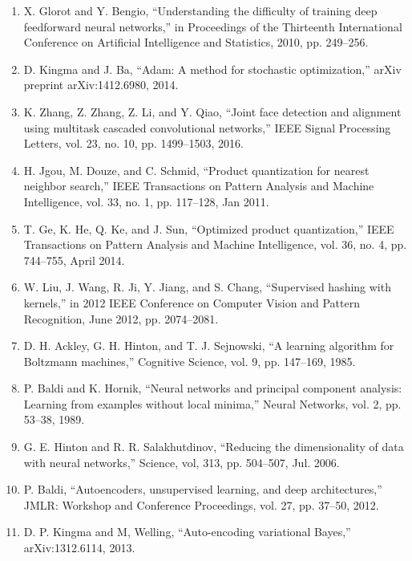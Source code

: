 \documentclass{article}
\begin{document}
\begin{enumerate}
	\item X. Glorot and Y. Bengio, “Understanding the difficulty of training
	deep feedforward neural networks,” in Proceedings of the Thirteenth
	International Conference on Artificial Intelligence and Statistics, 2010,
	pp. 249–256.

	\item D. Kingma and J. Ba, “Adam: A method for stochastic optimization,”
	arXiv preprint arXiv:1412.6980, 2014.

	\item K. Zhang, Z. Zhang, Z. Li, and Y. Qiao, “Joint face detection and
	alignment using multitask cascaded convolutional networks,” IEEE
	Signal Processing Letters, vol. 23, no. 10, pp. 1499–1503, 2016.

	\item H. Jgou, M. Douze, and C. Schmid, “Product quantization for nearest
	neighbor search,” IEEE Transactions on Pattern Analysis and Machine
	Intelligence, vol. 33, no. 1, pp. 117–128, Jan 2011.

	\item T. Ge, K. He, Q. Ke, and J. Sun, “Optimized product quantization,” IEEE
	Transactions on Pattern Analysis and Machine Intelligence, vol. 36,
	no. 4, pp. 744–755, April 2014.

	\item W. Liu, J. Wang, R. Ji, Y. Jiang, and S. Chang, “Supervised hashing
	with kernels,” in 2012 IEEE Conference on Computer Vision and Pattern
	Recognition, June 2012, pp. 2074–2081.
	
	\item D. H. Ackley, G. H. Hinton, and T. J. Sejnowski, “A learning algorithm for Boltzmann machines,” Cognitive Science, vol. 9, pp. 147–169, 1985.

	\item P. Baldi and K. Hornik, “Neural networks and principal component analysis: Learning from
	examples without local minima,” Neural Networks, vol. 2, pp. 53–38, 1989.

	\item G. E. Hinton and R. R. Salakhutdinov, “Reducing the dimensionality of data with neural
	networks,” Science, vol, 313, pp. 504–507, Jul. 2006.

	\item P. Baldi, “Autoencoders, unsupervised learning, and deep architectures,” JMLR: Workshop
	and Conference Proceedings, vol. 27, pp. 37–50, 2012.

	\item D. P. Kingma and M, Welling, “Auto-encoding variational Bayes,” arXiv:1312.6114, 2013.


\end{enumerate}
\end{document}
